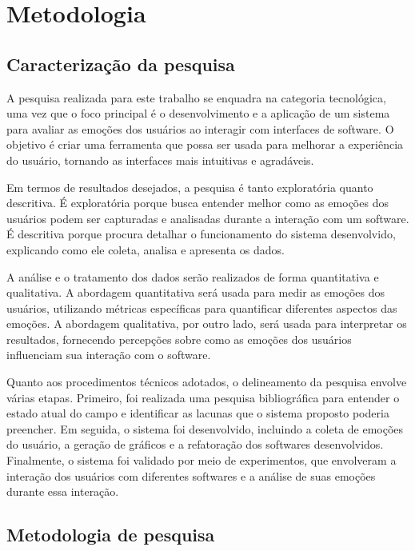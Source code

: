 \chapter{Metodologia}

\section{Caracterização da pesquisa}

A pesquisa realizada para este trabalho se enquadra na categoria tecnológica, uma vez que o foco principal é o desenvolvimento e a aplicação de um sistema para avaliar as emoções dos usuários ao interagir com interfaces de software. O objetivo é criar uma ferramenta que possa ser usada para melhorar a experiência do usuário, tornando as interfaces mais intuitivas e agradáveis.

Em termos de resultados desejados, a pesquisa é tanto exploratória quanto descritiva. É exploratória porque busca entender melhor como as emoções dos usuários podem ser capturadas e analisadas durante a interação com um software. É descritiva porque procura detalhar o funcionamento do sistema desenvolvido, explicando como ele coleta, analisa e apresenta os dados.

A análise e o tratamento dos dados serão realizados de forma quantitativa e qualitativa. A abordagem quantitativa será usada para medir as emoções dos usuários, utilizando métricas específicas para quantificar diferentes aspectos das emoções. A abordagem qualitativa, por outro lado, será usada para interpretar os resultados, fornecendo percepções sobre como as emoções dos usuários influenciam sua interação com o software.

Quanto aos procedimentos técnicos adotados, o delineamento da pesquisa envolve várias etapas. Primeiro, foi realizada uma pesquisa bibliográfica para entender o estado atual do campo e identificar as lacunas que o sistema proposto poderia preencher. Em seguida, o sistema foi desenvolvido, incluindo a coleta de emoções do usuário, a geração de gráficos e a refatoração dos softwares desenvolvidos. Finalmente, o sistema foi validado por meio de experimentos, que envolveram a interação dos usuários com diferentes softwares e a análise de suas emoções durante essa interação.

\section{Metodologia de pesquisa}

